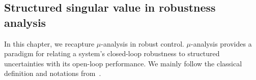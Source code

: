 \subsection{Structured singular value in robustness analysis}\label{subsec:mu}
In this chapter, we recapture $\mu$-analysis in robust control. 
$\mu$-analysis provides a paradigm for relating a system’s closed-loop robustness to structured uncertainties with its open-loop performance. We mainly follow the classical definition and notations from~\cite{packard_mainloop}.







